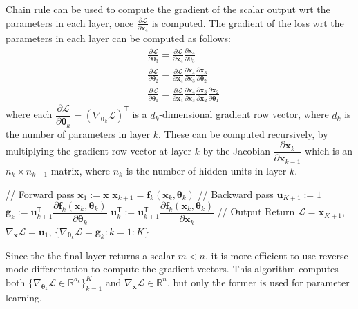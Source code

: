 \documentclass[11pt]{article}
\begin{document}
Chain rule can be used to compute the gradient of the scalar output wrt the parameters in each layer, once $\frac{\partial \mathcal{L}}{\partial \boldsymbol{x}_4}$ is computed. The gradient of the loss wrt the parameters in each layer can be computed as follows:
\[
\begin{aligned}
&\frac{\partial \mathcal{L}}{\partial \boldsymbol{\theta}_3} = \frac{\partial \mathcal{L}}{\partial \boldsymbol{x}_4} \frac{\partial \boldsymbol{x}_4}{\partial \boldsymbol{\theta}_3} \\
&\frac{\partial \mathcal{L}}{\partial \boldsymbol{\theta}_2} = \frac{\partial \mathcal{L}}{\partial \boldsymbol{x}_4} \frac{\partial \boldsymbol{x}_4}{\partial \boldsymbol{x}_3} \frac{\partial \boldsymbol{x}_3}{\partial \boldsymbol{\theta}_2} \\
&\frac{\partial \mathcal{L}}{\partial \boldsymbol{\theta}_1} = \frac{\partial \mathcal{L}}{\partial \boldsymbol{x}_4} \frac{\partial \boldsymbol{x}_4}{\partial \boldsymbol{x}_3} \frac{\partial \boldsymbol{x}_3}{\partial \boldsymbol{x}_2} \frac{\partial \boldsymbol{x}_2}{\partial \boldsymbol{\theta}_1}
\end{aligned}
\]
where each $\dfrac{\partial \mathcal{L}}{\partial \boldsymbol{\theta}_k} = (\nabla_{\boldsymbol{\theta}_k} \mathcal{L})^\mathsf{T}$ is a $d_k$-dimensional gradient row vector, where $d_k$ is the number of parameters in layer $k$. 
These can be computed recursively, by multiplying the gradient row vector at layer $k$ by the Jacobian $\dfrac{\partial \boldsymbol{x}_k}{\partial \boldsymbol{x}_{k-1}}$ which is an $n_k \times n_{k-1}$ matrix, where $n_k$ is the number of hidden units in layer $k$.

\begin{algorithm}[H]
\caption{Backpropagation for an MLP with $K$ layers and scalar output}
\begin{algorithmic}[1]
\State // Forward pass
\State $\boldsymbol{x}_1 := \boldsymbol{x}$
    \State $\boldsymbol{x}_{k+1} = \boldsymbol{f}_k(\boldsymbol{x}_k, \boldsymbol{\theta}_k)$
\EndFor
\State // Backward pass
\State $\boldsymbol{u}_{K+1} := 1$
    \State $\boldsymbol{g}_k := \boldsymbol{u}_{k+1}^\mathsf{T} \dfrac{\partial \boldsymbol{f}_k(\boldsymbol{x}_k, \boldsymbol{\theta}_k)}{\partial \boldsymbol{\theta}_k}$
    \State $\boldsymbol{u}_k^\mathsf{T} := \boldsymbol{u}_{k+1}^\mathsf{T} \dfrac{\partial \boldsymbol{f}_k(\boldsymbol{x}_k, \boldsymbol{\theta}_k)}{\partial \boldsymbol{x}_k}$
\EndFor
\State // Output
\State Return $\mathcal{L} = \boldsymbol{x}_{K+1}$, $\nabla_{\boldsymbol{x}} \mathcal{L} = \boldsymbol{u}_1$, $\{\nabla_{\boldsymbol{\theta}_k} \mathcal{L} = \boldsymbol{g}_k : k = 1:K\}$
\end{algorithmic}
\end{algorithm}
Since the the final layer returns a scalar $m < n$, it is more efficient to use reverse mode differentation to compute the gradient vectors.
This algorithm computes both $\{ \nabla_{\boldsymbol{\theta}_k} \mathcal{L} \in \mathbb{R}^{d_k} \}_ {k=1}^K$ and $\nabla_{\boldsymbol{x}} \mathcal{L} \in \mathbb{R}^n$, but only the former is used for parameter learning.
\end{document}
